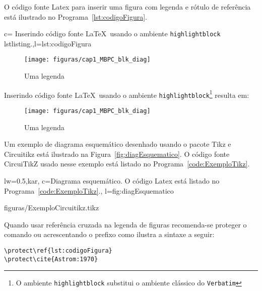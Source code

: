 O código fonte Latex para inserir uma figura com legenda e rótulo de referência está ilustrado no Programa~\ref{lst:codigoFigura}.

\begin{keyfigure}{ c= {Inserindo código fonte \LaTeX\, usando o ambiente  \texttt{highlightblock}  lstlisting.},l=lst:codigoFigura}
	\lstset{language=[Latex]Tex}
	\begin{highlightblock}
		\begin{figure}
			\texttt{[image: figuras/cap1\_MBPC\_blk\_diag]} 
			\caption{Uma legenda}  %
			\label{fig:cap1mbpcblkdiag}
		\end{figure}
	\end{highlightblock}
\end{keyfigure}

Inserindo código fonte \LaTeX\, usando o ambiente  \texttt{highlightblock}\footnote{O ambiente \texttt{highlightblock} substitui o ambiente clássico do \texttt{Verbatim}} resulta em:

\lstset{language=[Latex]Tex}
\begin{highlightblock}
	\begin{figure}
		\texttt{[image: figuras/cap1\_MBPC\_blk\_diag]} 
		\caption{Uma legenda}  %
		\label{fig:cap1mbpcblkdiag}
	\end{figure}
\end{highlightblock}

Um exemplo de diagrama esquemático desenhado usando o pacote Tikz e Circuitikz está ilustrado na Figura~\ref{fig:diagEsquematico}. O código fonte CircuiTikZ usado nesse exemplo está listado no Programa~\ref{code:ExemploTikz}.

\begin{keyfigure}{lw=0.5,kar,
	c={Diagrama esquemático. O código Latex está listado no Programa~\protect\ref{code:ExemploTikz}.},
	l=fig:diagEsquematico
}
\end{keyfigure}

 {figuras/ExemploCircuitikz.tikz}

Quando usar referência cruzada na legenda de figuras recomenda-se proteger o comando  ou  acrescentando o prefixo  como ilustra a sintaxe a seguir:
\begin{verbatim}
\protect\ref{lst:codigoFigura}
\protect\cite{Astrom:1970}
\end{verbatim}



